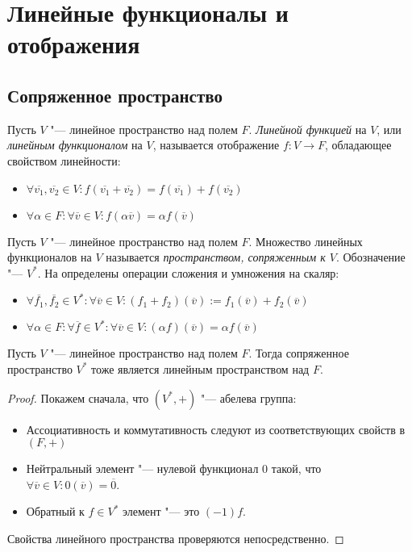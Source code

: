 \section{Линейные функционалы и отображения}

\subsection{Сопряженное пространство}

\begin{definition}
	Пусть $V$ "--- линейное пространство над полем $F$. \textit{Линейной функцией} на $V$, или \textit{линейным функционалом} на $V$, называется отображение $f : V \rightarrow F$, обладающее свойством линейности:
	\begin{itemize}
		\item $\forall \overline{v_1}, \overline{v_2} \in V: f(\overline{v_1} + \overline{v_2}) = f(\overline{v_1}) + f(\overline{v_2})$
		\item $\forall \alpha \in F: \forall \overline{v} \in V: f(\alpha\overline{v}) = \alpha f(\overline{v})$
	\end{itemize}
\end{definition}

\begin{definition}
	Пусть $V$ "--- линейное пространство над полем $F$. Множество линейных функционалов на $V$ называется \textit{пространством, сопряженным к $V$}. Обозначение "--- $V^*$. На определены операции сложения и умножения на скаляр:
	\begin{itemize}
		\item $\forall \overline{f_1}, \overline{f_2} \in V^*: \forall \overline{v} \in V: (f_1 + f_2)(\overline{v}) := f_1(\overline{v}) + f_2(\overline{v})$
		\item $\forall \alpha \in F: \forall \overline{f} \in V^*: \forall \overline{v} \in V:(\alpha f)(\overline{v}) = \alpha f(\overline{v})$
	\end{itemize}
\end{definition}

\begin{proposition}
	Пусть $V$ "--- линейное пространство над полем $F$. Тогда сопряженное пространство $V^*$ тоже является линейным пространством над $F$.
\end{proposition}

\begin{proof}
	Покажем сначала, что $(V^*, +)$ "--- абелева группа:
	\begin{itemize}
		\item Ассоциативность и коммутативность следуют из соответствующих свойств в $(F, +)$
		\item Нейтральный элемент "--- нулевой функционал $0$ такой, что $\forall \overline{v} \in V: 0(\overline{v}) = \overline{0}$.
		\item Обратный к $f \in V^*$ элемент "--- это $(-1)f$.
	\end{itemize}

	Свойства линейного пространства проверяются непосредственно.
\end{proof}

